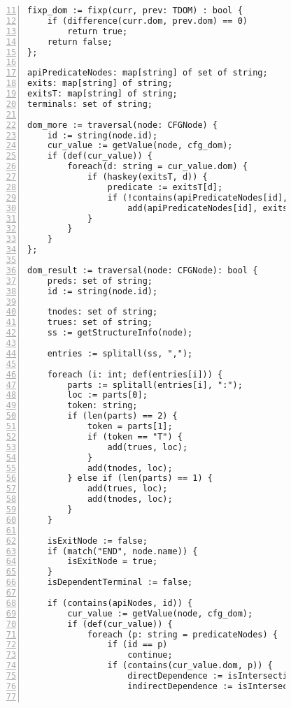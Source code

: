 \begin{figure}[ht!]
\begin{lstlisting}[numbers=left, tabsize=4, escapechar=@, caption={API Usage Mining Analysis},label={lst:aun-code}, firstline = 11, firstnumber = 11, lastline = 60]
fixp_dom := fixp(curr, prev: TDOM) : bool {
 	if (difference(curr.dom, prev.dom) == 0)
 		return true;	
 	return false;
};

apiPredicateNodes: map[string] of set of string;
exits: map[string] of string;
exitsT: map[string] of string;
terminals: set of string;

dom_more := traversal(node: CFGNode) {
    id := string(node.id);
    cur_value := getValue(node, cfg_dom);
    if (def(cur_value)) {
        foreach(d: string = cur_value.dom) {
            if (haskey(exitsT, d)) {
                predicate := exitsT[d];  
                if (!contains(apiPredicateNodes[id], predicate))
                    add(apiPredicateNodes[id], exits[d]);
            }
        }
    }
};

dom_result := traversal(node: CFGNode): bool {
    preds: set of string;
    id := string(node.id);
    
    tnodes: set of string;
    trues: set of string;
    ss := getStructureInfo(node);
    
    entries := splitall(ss, ",");
    
    foreach (i: int; def(entries[i])) {
    	parts := splitall(entries[i], ":"); 
    	loc := parts[0]; 
    	token: string;
    	if (len(parts) == 2) {
    	    token = parts[1];
    		if (token == "T") {
    		    add(trues, loc);    
    		}
            add(tnodes, loc);
    	} else if (len(parts) == 1) {
    	    add(trues, loc);  
    		add(tnodes, loc);
    	}
    }
    
    isExitNode := false;
    if (match("END", node.name)) {
        isExitNode = true;
    }
    isDependentTerminal := false;

    if (contains(apiNodes, id)) {
        cur_value := getValue(node, cfg_dom);
        if (def(cur_value)) {
            foreach (p: string = predicateNodes) {
                if (id == p)
                    continue;
                if (contains(cur_value.dom, p)) {
                    directDependence := isIntersectionNotNull(variables[id], variables[p]);
                    indirectDependence := isIntersectionNotNull(allVars, variables[p]);
                    

\end{lstlisting}
\end{figure}
